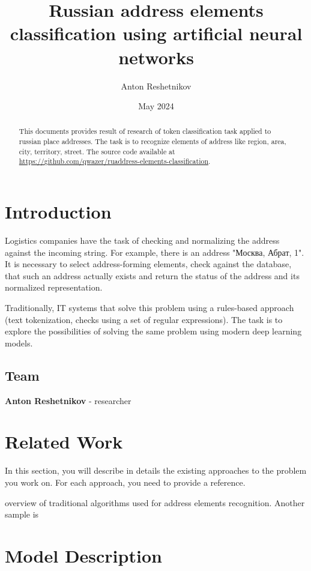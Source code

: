 \documentclass{article}
\title{Russian address elements classification using artificial neural networks}
\author{Anton Reshetnikov}
\date{May 2024}
\begin{document}
\maketitle
\begin{abstract}
    This documents provides result of research of token classification task applied to russian place addresses.
    The task is to recognize elements of address like region, area, city, territory, street.
    The source code available at
     \url{https://github.com/qwazer/ruaddress-elements-classification}.
\end{abstract}



\section{Introduction}

Logistics companies have the task of checking and normalizing the address against the incoming string.
For example, there is an address "Москва, Абрат, 1".
It is necessary to select address-forming elements, check against the database,
that such an address actually exists and return the status of the address and its normalized representation.

Traditionally, IT systems that solve this problem using a rules-based approach (text tokenization, checks using a set of regular expressions).
The task is to explore the possibilities of solving the same problem using modern deep learning models.

\subsection{Team}

\textbf{Anton Reshetnikov} - researcher



\section{Related Work}
\label{sec:related}
In this section, you will describe in details the existing approaches to the problem you work on. For each approach, you need to provide a reference.

\cite{makarov2020algo} overview of traditional algorithms used for address elements recognition.
Another sample is~\cite{habr2020gar}

\section{Model Description}
\end{document}
